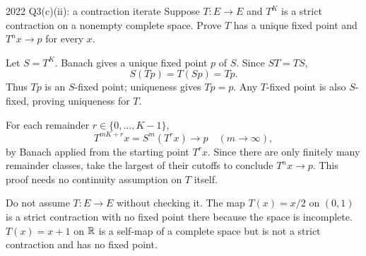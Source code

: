 \begin{exam}{2022 Q3(c)(ii): a contraction iterate}
Suppose $T:E\to E$ and $T^K$ is a strict contraction on a nonempty complete space. Prove $T$ has a unique fixed point and $T^nx\to p$ for every $x$.
\end{exam}
\begin{answer}
Let $S=T^K$. Banach gives a unique fixed point $p$ of $S$. Since $ST=TS$,
\[S(Tp)=T(Sp)=Tp.\]
Thus $Tp$ is an $S$-fixed point; uniqueness gives $Tp=p$. Any $T$-fixed point is also $S$-fixed, proving uniqueness for $T$.

For each remainder $r\in\{0,\ldots,K-1\}$,
\[T^{mK+r}x=S^m(T^rx)\longrightarrow p\quad(m\to\infty),\]
by Banach applied from the starting point $T^rx$. Since there are only finitely many remainder classes, take the largest of their cutoffs to conclude $T^nx\to p$. This proof needs no continuity assumption on $T$ itself.
\end{answer}
\begin{tip}
Do not assume $T:E\to E$ without checking it. The map $T(x)=x/2$ on $(0,1)$ is a strict contraction with no fixed point there because the space is incomplete. $T(x)=x+1$ on $\mathbb R$ is a self-map of a complete space but is not a strict contraction and has no fixed point.
\end{tip}


